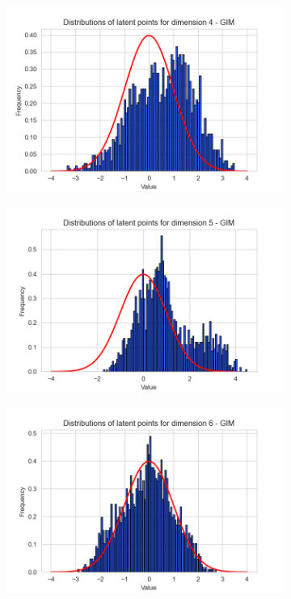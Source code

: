 \begin{figure}[h]
\begin{subfigure}[b]{0.25\textwidth}
	\end{subfigure}
	\hfill
	\begin{subfigure}[b]{0.25\textwidth}
		\centering
		\includegraphics[width=1\linewidth]{"graphs/distr/module2 kld0035/_ distribution_latent_space_GIM_dim=3"}
	\end{subfigure}
	\hfill
	\begin{subfigure}[b]{0.25\textwidth}
		\centering
		\includegraphics[width=1\linewidth]{"graphs/distr/module2 kld0035/_ distribution_latent_space_GIM_dim=4"}
	\end{subfigure}
	\hfill
	\begin{subfigure}[b]{0.25\textwidth}
		\centering
		\includegraphics[width=1\linewidth]{"graphs/distr/module2 kld0035/_ distribution_latent_space_GIM_dim=5"}

\end{subfigure}
\end{figure}
